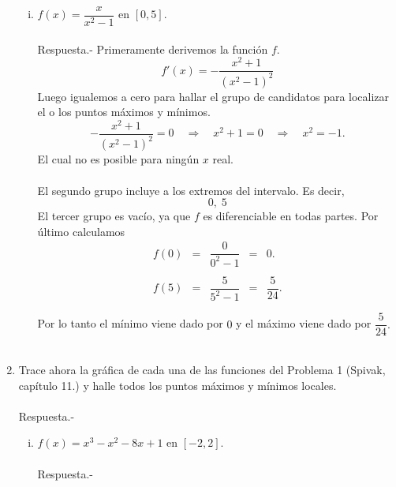 \begin{enumerate}[\bfseries 1.]
\begin{enumerate}[(i)]
	    \item $f(x)=\dfrac{x}{x^2-1}$ en $[0,5]$.\\\\
		Respuesta.-\; Primeramente derivemos la función $f$.
		$$f'(x)=-\dfrac{x^2+1}{\left(x^2-1\right)^2}$$
		Luego igualemos a cero para hallar el grupo de candidatos para localizar el o los puntos máximos y mínimos.
		$$-\dfrac{x^2+1}{\left(x^2-1\right)^2}=0 \quad \Rightarrow \quad x^2+1=0\quad  \Rightarrow \quad  x^2=-1.$$
		El cual no es posible para ningún $x$ real.\\\\
		El segundo grupo incluye a los extremos del intervalo. Es decir,
		$$0,\;5$$
		El tercer grupo es vacío, ya que $f$ es diferenciable en todas partes. Por último calculamos 
		$$\begin{array}{ccccl}
		    f\left(0\right) &=& \dfrac{0}{0^2-1} &=&0.\\\\
		    f\left(5\right) &=& \dfrac{5}{5^2-1} &=&\dfrac{5}{24}.\\\\
		\end{array}$$
		Por lo tanto el mínimo viene dado por $0$ y el máximo viene dado por $\dfrac{5}{24}.$\\\\

	\end{enumerate}

    \item Trace ahora la gráfica de cada una de las funciones del Problema 1 (Spivak, capítulo 11.) y halle todos los puntos máximos y mínimos locales.\\\\
	Respuesta.-\;

	\begin{enumerate}[(i)]

	    \item $f(x)=x^3-x^2-8x+1$ en $[-2,2]$.\\\\
		Respuesta.-\; 
		\begin{center}
		\end{center}


\end{enumerate}
\end{enumerate}
